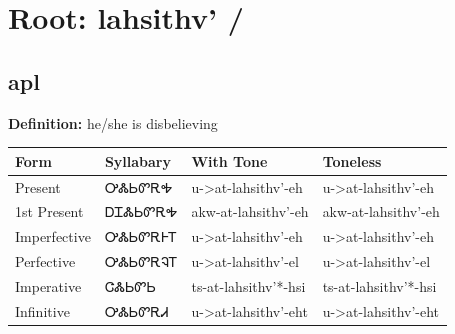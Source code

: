 \documentclass{article}%
\begin{document}
%
\normalsize%
\section*{Root: lahsithv' / }%
\subsection*{apl}%
\textbf{Definition: }%
he/she is disbelieving%
\\[0.5em]%
\begin{tabular}{|l|l|l|l|}%
\hline%
\textbf{Form}&\textbf{Syllabary}&\textbf{With Tone}&\textbf{Toneless}\\%
\hline%
Present&ᎤᏜᏏᏛᎡᎭ&u{-}>at{-}lahsithv'{-}eh&u{-}>at{-}lahsithv'{-}eh\\%
1st Present&ᎠᏆᏜᏏᏛᎡᎭ&akw{-}at{-}lahsithv'{-}eh&akw{-}at{-}lahsithv'{-}eh\\%
Imperfective&ᎤᏜᏏᏛᎡᎰᎢ&u{-}>at{-}lahsithv'{-}eh&u{-}>at{-}lahsithv'{-}eh\\%
Perfective&ᎤᏜᏏᏛᎡᎸᎢ&u{-}>at{-}lahsithv'{-}el&u{-}>at{-}lahsithv'{-}el\\%
Imperative&ᏣᏜᏏᏛᏏ&ts{-}at{-}lahsithv'*{-}hsi&ts{-}at{-}lahsithv'*{-}hsi\\%
Infinitive&ᎤᏜᏏᏛᎡᏗ&u{-}>at{-}lahsithv'{-}eht&u{-}>at{-}lahsithv'{-}eht\\%
\hline%
\end{tabular}%
\\[1em]%
\end{document}
